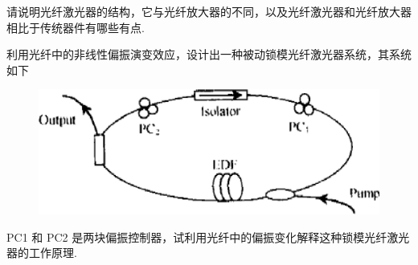 \documentclass{assignment}
\begin{document}
\begin{prob}
    请说明光纤激光器的结构，它与光纤放大器的不同，以及光纤激光器和光纤放大器相比于传统器件有哪些有点.
\end{prob}
\begin{ans}
    
\end{ans}

\begin{prob}
    利用光纤中的非线性偏振演变效应，设计出一种被动锁模光纤激光器系统，其系统如下
    \begin{figure}[H]
        \centering
        \includegraphics[width=.5\columnwidth]{5-1.png}
    \end{figure}
    PC1 和 PC2 是两块偏振控制器，试利用光纤中的偏振变化解释这种锁模光纤激光器的工作原理.
\end{prob}
\begin{ans}
    
\end{ans}
\end{document}
